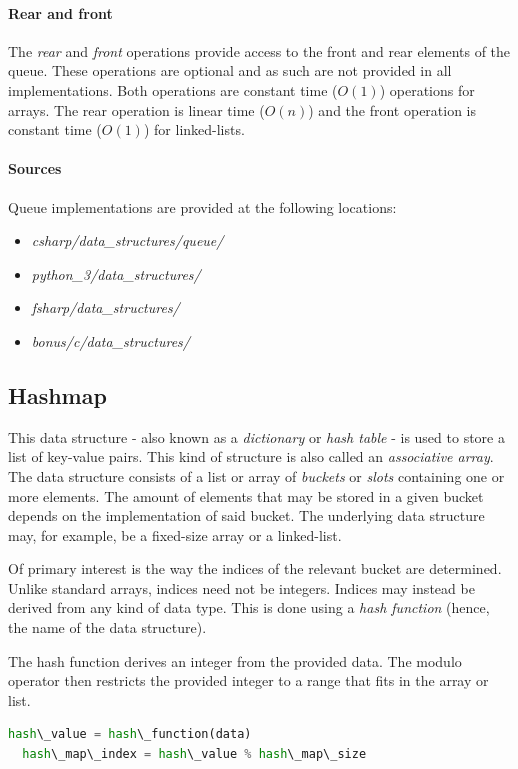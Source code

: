 \documentclass{article}
\begin{document}
\paragraph{Rear and front}
The {\em rear} and {\em front} operations provide access to the front and rear elements of the queue.
These operations are optional and as such are not provided in all implementations.
Both operations are constant time (\(O(1)\)) operations for arrays.
The rear operation is linear time (\(O(n)\)) and the front operation is constant time (\(O(1)\)) for linked-lists.

\paragraph{Sources}
Queue implementations are provided at the following locations:
\begin{itemize}
\item{{\em csharp/data\_structures/queue/}}
\item{{\em python\_3/data\_structures/}}
\item{{\em fsharp/data\_structures/}}
\item{{\em bonus/c/data\_structures/}}
\end{itemize}


\newpage


\subsection{Hashmap}
This data structure - also known as a {\em dictionary} or {\em hash table} -
is used to store a list of key-value pairs. This kind of structure is also called an {\em associative array}.
The data structure consists of a list or array of {\em buckets} or {\em slots} containing one or
more elements. The amount of elements that may be stored in a given bucket depends on the implementation of said
bucket. The underlying data structure may, for example, be a fixed-size array or a linked-list.

Of primary interest is the way the indices of the relevant bucket are determined.
Unlike standard arrays, indices need not be integers. Indices may instead be derived from any kind of data type.
This is done using a {\em hash function} (hence, the name of the data structure).

The hash function derives an integer from the provided data. The modulo operator then restricts the provided
integer to a range that fits in the array or list.

\begin{lstlisting}[language=Python]
  hash\_value = hash\_function(data)
  hash\_map\_index = hash\_value % hash\_map\_size
\end{lstlisting}
\end{document}
